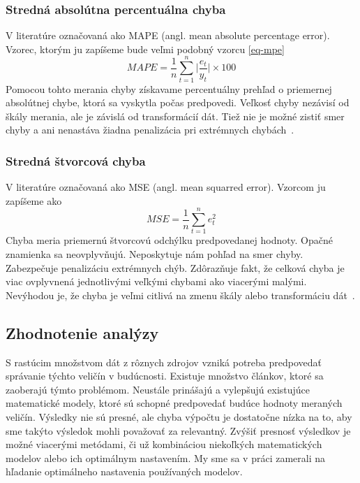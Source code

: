 \documentclass[a4paper,slovak,12pt,appendix]{article}
\begin{document}
\subsubsection{Stredná absolútna percentuálna chyba}
\label{mape}
V literatúre označovaná ako MAPE (angl. mean absolute percentage error). Vzorec,
ktorým ju zapíšeme bude veľmi podobný vzorcu \ref{eq-mpe}
\begin{equation}
  MAPE = \frac{1}{n} \sum_{t=1}^{n} \Big|\frac{e_t}{y_t}\Big| \times 100
  \label{eq-mape}
\end{equation}
Pomocou tohto merania chyby získavame percentuálny prehľad o priemernej
absolútnej chybe, ktorá sa vyskytla počas predpovedi. Veľkosť chyby nezávisí od
škály merania, ale je závislá od transformácií dát. Tiež nie je možné zistiť
smer chyby a ani nenastáva žiadna penalizácia pri extrémnych
chybách~\cite{Agrawal2013}.

\subsubsection{Stredná štvorcová chyba}
V literatúre označovaná ako MSE (angl. mean squarred error). Vzorcom ju zapíšeme ako
\begin{equation}
  MSE = \frac{1}{n} \sum_{t=1}^{n} e_t^2
  \label{eq-mse}
\end{equation}
Chyba meria priemernú štvorcovú odchýlku predpovedanej hodnoty. Opačné
znamienka sa neovplyvňujú. Neposkytuje nám pohľad na smer chyby. Zabezpečuje
penalizáciu extrémnych chýb. Zdôrazňuje fakt, že celková chyba je viac
ovplyvnená jednotlivými veľkými chybami ako viacerými malými. Nevýhodou je, že
chyba je veľmi citlivá na zmenu škály alebo transformáciu
dát~\cite{Agrawal2013}.


\subsection{Zhodnotenie analýzy}
S rastúcim množstvom dát z rôznych zdrojov vzniká potreba predpovedať správanie
týchto veličín v budúcnosti. Existuje množstvo článkov, ktoré sa zaoberajú
týmto problémom. Neustále prinášajú a vylepšujú existujúce matematické modely,
ktoré sú schopné predpovedať budúce hodnoty meraných veličín. Výsledky nie sú
presné, ale chyba výpočtu je dostatočne nízka na to, aby sme takýto výsledok
mohli považovať za relevantný. Zvýšiť presnosť výsledkov je možné viacerými
metódami, či už kombináciou niekoľkých matematických modelov alebo ich
optimálnym nastavením. My sme sa v práci zamerali na hľadanie optimálneho
nastavenia používaných modelov.
\end{document}
